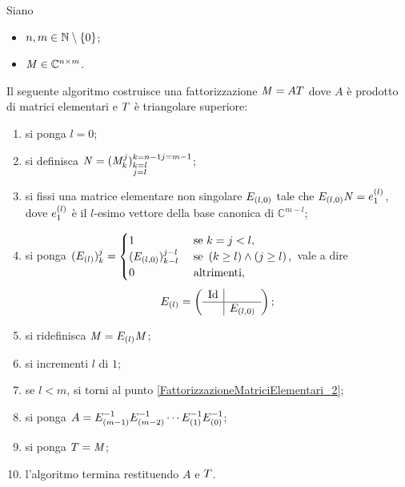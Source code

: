 \begin{Theorem}
  \label{th_FattorizzazioneMatriciElementari}
  Siano
  \begin{itemize}
    \item $n, m \in \mathbb{N} \setminus \lbrace 0 \rbrace$;
    \item $\mathit{M} \in \mathbb{C}^{n \times m}$.
  \end{itemize}
  Il seguente algoritmo costruisce una fattorizzazione
  $\mathit{M} = A T$ dove $A$ \`e prodotto di matrici
  elementari e $T$ \`e triangolare superiore:
  \begin{enumerate}
    \item\label{FattorizzazioneMatriciElementari_1} si ponga $l = 0$;
    \item\label{FattorizzazioneMatriciElementari_2} si definisca
      $\mathit{N} = (\mathit{M}_k^j)_{\substack{k = l\\j= l}}^{\substack{k = n - 1}{j = m - 1}}$;
    \item\label{FattorizzazioneMatriciElementari_3} si fissi una matrice
      elementare non singolare $E_{(l,0)}$ tale che
      $E_{(l,0)}\mathit{N} = e_1^{(l)}$, dove
      $e_1^{(l)}$ \`e il $l$-esimo vettore della base
      canonica di $\mathbb{C}^{m - l}$;
    \item\label{FattorizzazioneMatriciElementari_4} si ponga
      $(E_{(l)})_k^j =
      \begin{cases}
        1&\text{ se }k = j < l,\\
        (E_{(l,0)})_{k - l}^{j - l}&\text{ se }\left ( k \geq l \right ) \wedge \left ( j \geq l \right ),\\
        0&\text{ altrimenti},
      \end{cases}$
      vale a dire
      \[
        \ElementaryMatrix_{(l)} =
        \lmatrix
        \begin{array}{c|c}
          \Identity &\\
          \hline
          & \ElementaryMatrix_{(l,0)}
        \end{array}
        \rmatrix;
      \]
    \item\label{FattorizzazioneMatriciElementari_5} si ridefinisca
      $\mathit{M} = E_{(l)}\mathit{M}$;
    \item\label{FattorizzazioneMatriciElementari_6} si incrementi
      $l$ di $1$;
    \item\label{FattorizzazioneMatriciElementari_7} se $l < m$, si torni al
      punto \ref{FattorizzazioneMatriciElementari_2};
    \item\label{FattorizzazioneMatriciElementari_8} si ponga
      $A = E_{(m - 1)}^{-1}E_{(m - 2)}^{-1}
      \cdots
      E_{(1)}^{-1}E_{(0)}^{-1}$;
    \item\label{FattorizzazioneMatriciElementari_9} si ponga
      $T = \mathit{M}$;
    \item\label{FattorizzazioneMatriciElementari_10} l'algoritmo termina restituendo
      $A$ e $T$.
  \end{enumerate}
\end{Theorem}
